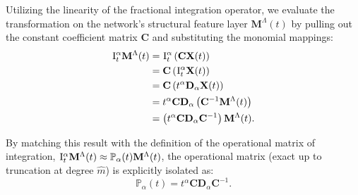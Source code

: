 \documentclass[11pt, a4paper]{article}
\theoremstyle{theoremstyle}
\theoremstyle{definitionstyle}
\begin{document}
Utilizing the linearity of the fractional integration operator, we evaluate the transformation on the network's structural feature layer $\mathbf{M}^\Lambda(t)$ by pulling out the constant coefficient matrix $\mathbf{C}$ and substituting the monomial mappings:
\begin{equation}
\begin{aligned}
    \II \mathbf{M}^\Lambda(t) &= \II \left( \mathbf{C} \mathbf{X}(t) \right) \\
    &= \mathbf{C} \left( \II \mathbf{X}(t) \right) \\
    &= \mathbf{C} \left( t^\alpha \mathbf{D}_\alpha \mathbf{X}(t) \right) \\
    &= t^\alpha \mathbf{C} \mathbf{D}_\alpha \left( \mathbf{C}^{-1} \mathbf{M}^\Lambda(t) \right) \\
    &= \left( t^\alpha \mathbf{C} \mathbf{D}_\alpha \mathbf{C}^{-1} \right) \mathbf{M}^\Lambda(t).
\end{aligned}
\end{equation}

By matching this result with the definition of the operational matrix of integration, $\II \mathbf{M}^\Lambda(t) \approx \mathbb P_\alpha(t) \mathbf{M}^\Lambda(t)$, the operational matrix (exact up to truncation at degree $\hat{m}$) is explicitly isolated as:
\begin{equation} \mathbb P_\alpha(t) = t^\alpha \mathbf{C} \mathbf{D}_\alpha \mathbf{C}^{-1}. \end{equation}
\end{document}
